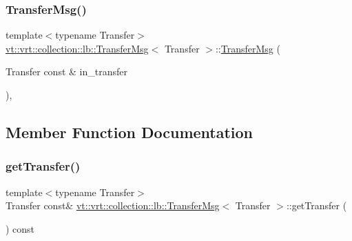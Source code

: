 \mbox{\label{structvt_1_1vrt_1_1collection_1_1lb_1_1_transfer_msg_a3f2753a92fc1d0fa93489b9adf102533}} 
\subsubsection{\texorpdfstring{Transfer\+Msg()}{TransferMsg()}\hspace{0.1cm}{\footnotesize\ttfamily [2/2]}}
{\footnotesize\ttfamily template$<$typename Transfer$>$ \\
\hyperlink{structvt_1_1vrt_1_1collection_1_1lb_1_1_transfer_msg}{vt\+::vrt\+::collection\+::lb\+::\+Transfer\+Msg}$<$ Transfer $>$\+::\hyperlink{structvt_1_1vrt_1_1collection_1_1lb_1_1_transfer_msg}{Transfer\+Msg} (\begin{DoxyParamCaption}\item[{Transfer const \&}]{in\+\_\+transfer }\end{DoxyParamCaption})\hspace{0.3cm}{\ttfamily [inline]}, {\ttfamily [explicit]}}



\subsection{Member Function Documentation}
\mbox{\label{structvt_1_1vrt_1_1collection_1_1lb_1_1_transfer_msg_a9c93bf7d69be7e2bff65999cc4fadf98}} 
\subsubsection{\texorpdfstring{get\+Transfer()}{getTransfer()}}
{\footnotesize\ttfamily template$<$typename Transfer$>$ \\
Transfer const\& \hyperlink{structvt_1_1vrt_1_1collection_1_1lb_1_1_transfer_msg}{vt\+::vrt\+::collection\+::lb\+::\+Transfer\+Msg}$<$ Transfer $>$\+::get\+Transfer (\begin{DoxyParamCaption}{ }\end{DoxyParamCaption}) const\hspace{0.3cm}{\ttfamily [inline]}}

